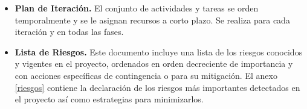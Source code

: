 \begin{itemize}
\item \textbf{Plan de Iteración.} El conjunto de actividades y tareas se orden temporalmente y se le asignan recursos a corto plazo. Se realiza para cada iteración y en todas las fases. 

\item \textbf{Lista de Riesgos.} Este documento incluye una lista de los riesgos conocidos y vigentes en el proyecto, ordenados en orden decreciente de importancia y con acciones específicas de contingencia o para su mitigación. El anexo \ref{riesgos} contiene la declaración de los riesgos más importantes detectados en el proyecto así como estrategias para minimizarlos.

\end{itemize}